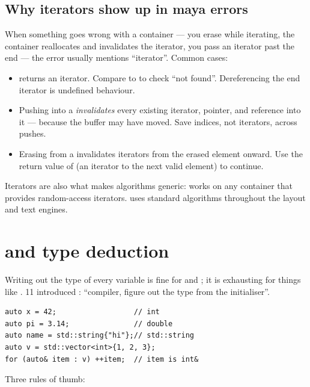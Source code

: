 \subsection{Why iterators show up in maya errors}

When something goes wrong with a container --- you erase while
iterating, the container reallocates and invalidates the iterator,
you pass an iterator past the end --- the error usually mentions
``iterator''. Common cases:

\begin{itemize}[leftmargin=*]
  \item {} returns an iterator. Compare to
     to check ``not found''. Dereferencing the
    end iterator is undefined behaviour.
  \item Pushing into a  \emph{invalidates}
    every existing iterator, pointer, and reference into it ---
    because the buffer may have moved. Save indices, not
    iterators, across pushes.
  \item Erasing from a  invalidates iterators
    from the erased element onward. Use the return value of
     (an iterator to the next valid element) to
    continue.
\end{itemize}

Iterators are also what makes algorithms generic:  works on any container that provides random-access
iterators. \maya{} uses standard algorithms throughout the layout
and text engines.

\section{ and type deduction}
\label{sec:cpp:auto}

Writing out the type of every variable is fine for  and
; it is exhausting for things like
.
\cpp{}11 introduced : ``compiler, figure out the type from
the initialiser''.

\begin{lstlisting}
auto x = 42;                  // int
auto pi = 3.14;               // double
auto name = std::string{"hi"};// std::string
auto v = std::vector<int>{1, 2, 3};
for (auto& item : v) ++item;  // item is int&
\end{lstlisting}

Three rules of thumb:

